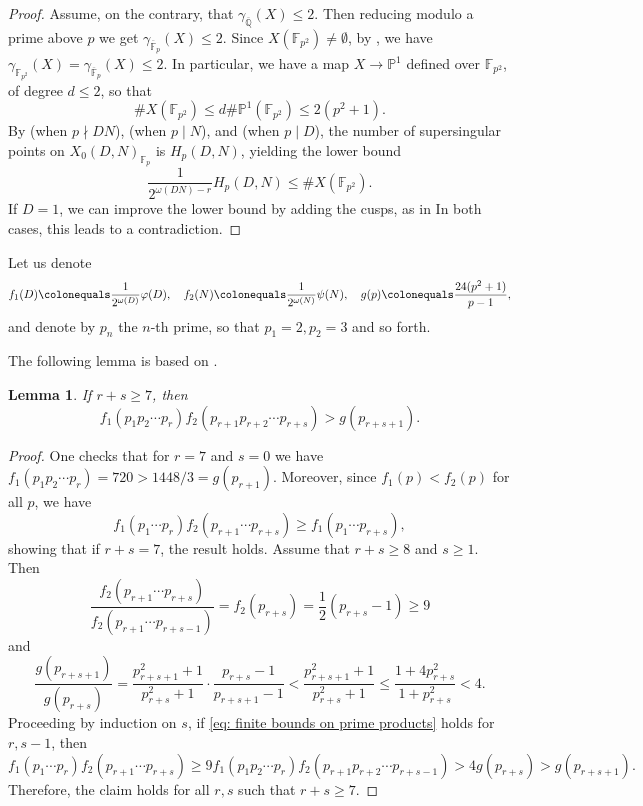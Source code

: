 \documentclass[12pt]{amsart}
\newcommand{\F}{\mathbb{F}}
\renewcommand{\P}{\mathbb{P}}
\newcommand{\Q}{\mathbb{Q}}
\newcommand{\Qbar}{{\overline{\Q}}}
\newcommand{\Fbar}{{\overline{\F}}}
\numberwithin{equation}{subsection}
\theoremstyle{plain}\newtheorem{ithm}{Theorem}
\theoremstyle{plain}\newtheorem{iprop}[ithm]{Proposition}
\newtheorem{lemma}[equation]{Lemma}
\theoremstyle{definition}
\theoremstyle{remark}
\newcommand{\Curve}[2]{X_0({#1},{#2})} %
\begin{document}
\begin{proof}
    Assume, on the contrary, that $\gamma_{\Qbar}(X) \le 2$. Then reducing modulo a prime above $p$ we get $\gamma_{\Fbar_p}(X) \le 2$. 
    Since $X(\F_{p^2}) \ne \emptyset$, by \cite[Theorem 2.5]{Poonen}, we have $\gamma_{\F_{p^2}}(X) = \gamma_{\Fbar_p}(X) \le 2$.
    In particular, we have a map $X \to \P^1$ defined over $\F_{p^2}$, of degree $d \le 2$, so that 
    \begin{equation}
    \label{bound:finitefield}
    \#X(\F_{p^2}) \le d \# \P^1(\F_{p^2}) \le 2(p^2 + 1).
    \end{equation}
    By \cite[Theorem 3.4]{Ribet89SS} (when $p \nmid DN$), \cite[Theorem 4.7(v)]{Buzzard} (when $p \mid N$), and \cite[p.9 before (3.5)]{KR08} (when $p \mid D$), the number of supersingular points on $\Curve{D}{N}_{\F_p}$ is $H_p(D,N)$,
    yielding the lower bound
    $$
    \frac{1}{2^{\omega(DN)-r}} H_p(D,N) \le \#X(\F_{p^2}).
    $$
    If $D = 1$, we can improve the lower bound by adding the cusps, as in \cite[Proposition 1]{FH99} 
    In both cases, this leads to a contradiction. 
\end{proof}

Let us denote
$$
    f_1(D) \colonequals \frac{1}{2^{\omega(D)}} \varphi(D), \quad
    f_2(N) \colonequals \frac{1}{2^{\omega(N)}} \psi(N), \quad 
    g(p) \colonequals \frac{24(p^2+1)}{p-1},
$$
and denote by $p_n$ the $n$-th prime, so that $p_1 = 2, p_2 = 3$ and so forth.

The following lemma is based on \cite[Lemma, p.181]{HH96}.

\begin{lemma} \label{lem: finite bounds}
  If $r+s \ge 7$, then 
  \begin{equation} \label{eq: finite bounds on prime products}
  f_1(p_1 p_2 \cdots p_r)f_2(p_{r+1} p_{r+2} \cdots p_{r+s}) > g(p_{r+s+1}).
  \end{equation}
\end{lemma}

\begin{proof}
   One checks that for $r = 7$ and $s = 0$ we have $f_1(p_1 p_2 \cdots p_r) = 720 > 1448/3 = g(p_{r+1})$. Moreover, since $f_1(p) < f_2(p)$ for all $p$, we have
   \begin{equation*}
   f_1(p_1 \cdots p_r) f_2(p_{r+1} \cdots p_{r+s}) \ge f_1(p_1 \cdots p_{r+s}),
   \end{equation*}
   showing that if $r+s = 7$, the result holds.
   Assume that $r+s \ge 8$ and $s \ge 1$. Then
    $$
    \frac{f_2(p_{r+1} \cdots p_{r+s})}{f_2(p_{r+1} \cdots p_{r+s-1})} = f_2(p_{r+s}) = \frac{1}{2}(p_{r+s} - 1) \ge 9
    $$
    and 
    $$
    \frac{g(p_{r+s+1})}{g(p_{r+s})} = \frac{p_{r+s+1}^2 + 1}{p_{r+s}^2+1} \cdot \frac{p_{r+s} - 1}{p_{r+s+1}-1}
    < \frac{p_{r+s+1}^2+1}{p_{r+s}^2+1} \le \frac{1 + 4p_{r+s}^2}{1 + p_{r+s}^2} < 4.
    $$
    Proceeding by induction on $s$, if \eqref{eq: finite bounds on prime products} holds for $r, s - 1$, then
    $$
    f_1(p_1\cdots p_r)f_2(p_{r+1} \cdots p_{r+s}) \ge 9 f_1(p_1 p_2 \cdots p_r)f_2(p_{r+1} p_{r+2} \cdots p_{r+s-1}) > 4 g(p_{r+s}) > g(p_{r+s+1}).
    $$
    Therefore, the claim holds for all $r,s$ such that $r+s \ge 7$.
\end{proof}
\end{document}
